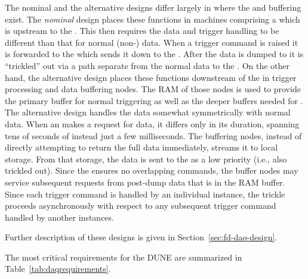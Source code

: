 The nominal and the alternative  designs differ largely in where
the  and  buffering exist. 
The \textit{nominal} design places these functions in machines
comprising a  which is upstream to the . 
This then requires the  data and trigger handling to be
different than that for normal (non-) data. 
When a  trigger command is raised it is forwarded to the
 which sends it down to the . 
After the  data is dumped to  it is
``trickled'' out via a path separate from the normal data to the
. 
On the other hand, the alternative design places these
functions downstream of the  in trigger processing and data
buffering nodes.
The RAM of those nodes is used to provide the primary  buffer for
normal triggering as well as the deeper buffers needed for . 
The alternative design handles the  data somewhat
symmetrically with normal data. 
When an  makes a request for  data, it differs
only in its duration, spanning tens of seconds of instead just a few
milliseconds. 
The  buffering nodes, instead of directly attempting to
return the full  data immediately, streams it to local
 storage. 
From that storage, the data is sent to the  as a low
priority (i.e., also trickled out).
Since the  ensures no overlapping commands, the buffer
nodes may service subsequent requests from post-dump data that is %
in the RAM buffer.
Since each trigger command is handled by an individual 
instance, the trickle proceeds asynchronously with respect to any subsequent
trigger command handled by another  instances.

Further description of %
these designs
is
given in Section~\ref{sec:fd-daq-design}.


The most critical requirements for the DUNE   
are summarized in Table~\ref{tab:daqrequirements}.

